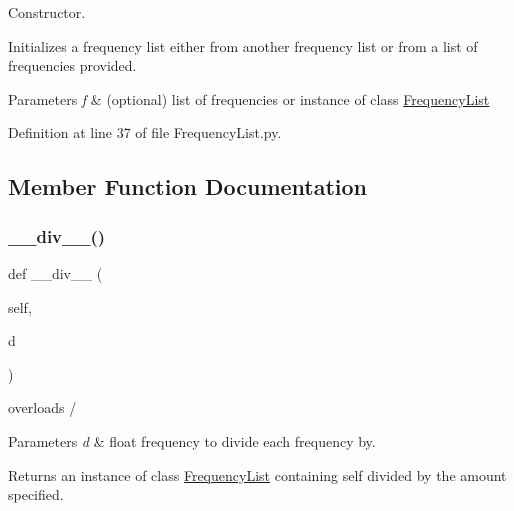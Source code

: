 Constructor. 

Initializes a frequency list either from another frequency list or from a list of frequencies provided. 
\begin{DoxyParams}{Parameters}
{\em f} & (optional) list of frequencies or instance of class \hyperlink{classSignalIntegrity_1_1FrequencyDomain_1_1FrequencyList_1_1FrequencyList}{Frequency\+List} \\
\hline
\end{DoxyParams}


Definition at line 37 of file Frequency\+List.\+py.



\subsection{Member Function Documentation}
\mbox{\label{classSignalIntegrity_1_1FrequencyDomain_1_1FrequencyList_1_1FrequencyList_a5780a728adfb401a59d29d748b4abf91}} 
\subsubsection{\texorpdfstring{\+\_\+\+\_\+div\+\_\+\+\_\+()}{\_\_div\_\_()}}
{\footnotesize\ttfamily def \+\_\+\+\_\+div\+\_\+\+\_\+ (\begin{DoxyParamCaption}\item[{}]{self,  }\item[{}]{d }\end{DoxyParamCaption})}



overloads / 


\begin{DoxyParams}{Parameters}
{\em d} & float frequency to divide each frequency by. \\
\hline
\end{DoxyParams}
\begin{DoxyReturn}{Returns}
an instance of class \hyperlink{classSignalIntegrity_1_1FrequencyDomain_1_1FrequencyList_1_1FrequencyList}{Frequency\+List} containing self divided by the amount specified. 
\end{DoxyReturn}


